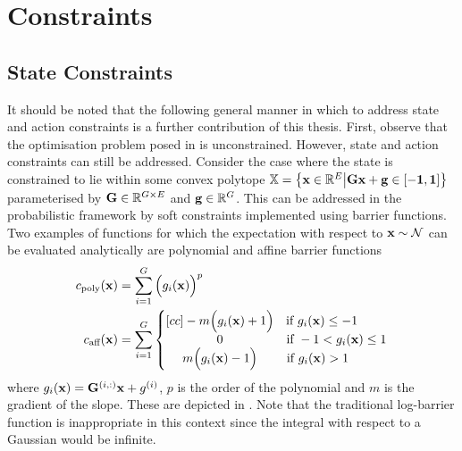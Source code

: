 \section{Constraints}
\subsection{State Constraints}


It should be noted that the following general manner in which to address state and action constraints is a further contribution of this thesis. First, observe that the optimisation problem posed in  is unconstrained. However, state and action constraints can still be addressed.
Consider the case where the state is constrained to lie within some convex polytope $\mathbb{X} = \big\{\mathbf{x} \in \mathbb{R}^E \big| \mathbf{G}\mathbf{x} + \mathbf{g} \in [-\mathbf{1},\mathbf{1}] \big\}$ parameterised by $\mathbf{G} \in \mathbb{R}^{G\times E}$ and $\mathbf{g} \in \mathbb{R}^{G}$. This can be addressed in the probabilistic framework by soft constraints implemented using barrier functions. Two examples of functions for which the expectation with respect to $\mathbf{x} \sim \mathcal{N}$ can be evaluated analytically are polynomial and affine barrier functions
\begin{align}
c_{\text{poly}}(\bx) &= \sum_{i=1}^G \Big( g_i(\bx) \Big)^p
\label{eqn:con_poly} \\
c_{\text{aff}}(\bx) &= \sum_{i=1}^G \left\{\begin{matrix}[cc]
-m\Big(g_i(\bx) + 1\Big) & \!\!\!\!\!\!\!\!\!\!\!\!\!\! \text{if } g_i(\bx) \leq -1 \\
0 &  \text{if } -1 < g_i(\bx) \leq 1 \\
m\Big(g_i(\bx) - 1\Big) & \!\!\!\!\!\!\!\!\!\!\!\!\!\!\!\!\!\! \text{if } g_i(\bx) > 1
\end{matrix} \right.
\label{eqn:con_aff}
\end{align}
where $g_i(\mathbf{x}) = \mathbf{G}^{(i,:)}\mathbf{x} + g^{(i)}$, $p$ is the order of the polynomial and $m$ is the gradient of the slope. These are depicted in . Note that the traditional log-barrier function is inappropriate in this context since the integral with respect to a Gaussian would be infinite.




